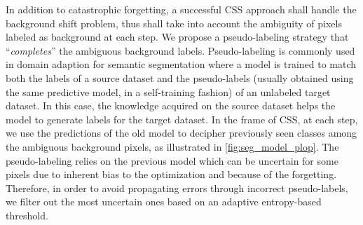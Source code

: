 In addition to catastrophic forgetting, a successful \ac{CSS} approach shall handle the background shift
problem, thus shall take into account the ambiguity of pixels labeled as background at each step.
We propose a pseudo-labeling strategy that ``\textit{completes}'' the ambiguous background labels.
Pseudo-labeling \citep{lee2013pseudolabel} is commonly used in domain adaption for semantic
segmentation
\citep{vu2019advent,li2019bidirectionallearning,zou2018classbalancedselftraining,saporta2020esl}
where a model is trained to match both the labels of a source dataset and the pseudo-labels (usually
obtained using the same predictive model, in a self-training fashion) of an unlabeled target
dataset. In this case, the knowledge acquired on the source dataset helps the model to generate
labels for the target dataset. In the frame of \ac{CSS}, at each step, we use the predictions of the old
model to decipher previously seen classes among the ambiguous background pixels, as illustrated in
\autoref{fig:seg_model_plop}. The pseudo-labeling relies on the previous model which can be uncertain
for some pixels due to inherent bias to the optimization and because of the forgetting. Therefore,
in order to avoid propagating errors through incorrect pseudo-labels, we filter out the most uncertain
ones based on an adaptive entropy-based threshold.

